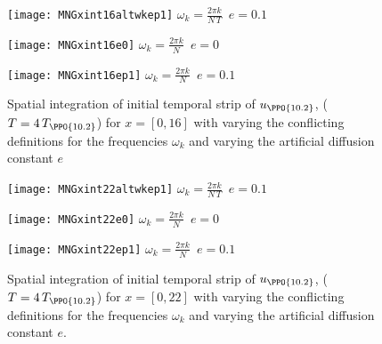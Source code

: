 \begin{description}
\begin{figure}[h]
  \begin{minipage}[height=.40\textheight]{.32\textwidth}
    \centering
    \texttt{[image: MNGxint16altwkep1]}
    \small{\texttt{$\omega_k = \frac{2 \pi k}{N\,T}$ $e=0.1$}}
  \end{minipage}
  \begin{minipage}[height=.40\textheight]{.32\textwidth}
    \centering
    \texttt{[image: MNGxint16e0]}
    \small{\texttt{$\omega_k = \frac{2 \pi k}{N}$ $e=0$}}
  \end{minipage}
  \begin{minipage}[height=.40\textheight]{.32\textwidth}
    \centering
    \texttt{[image: MNGxint16ep1]}
    \small{\texttt{$\omega_k = \frac{2 \pi k}{N}$ $e=0.1$}}
  \end{minipage}
  \caption{
  Spatial integration of initial temporal strip of $u_{\PPO{10.2}}$, ($T=4\,T_{\PPO{10.2}}$) for $x = [0,16]$
  with varying the conflicting definitions for the frequencies $\omega_k$ and varying the artificial diffusion constant $e$}
  \label{fig:MNGxint16}
\end{figure}

\begin{figure}[h]
  \begin{minipage}[height=.40\textheight]{.32\textwidth}
    \centering
    \texttt{[image: MNGxint22altwkep1]}
    \small{\texttt{$\omega_k = \frac{2 \pi k}{N\,T}$ $e=0.1$}}
  \end{minipage}
  \begin{minipage}[height=.40\textheight]{.32\textwidth}
    \centering
    \texttt{[image: MNGxint22e0]}
    \small{\texttt{$\omega_k = \frac{2 \pi k}{N}$ $e=0$}}
  \end{minipage}
  \begin{minipage}[height=.25\textheight]{.32\textwidth}
    \centering
    \texttt{[image: MNGxint22ep1]}
    \small{\texttt{$\omega_k = \frac{2 \pi k}{N}$ $e=0.1$}}
  \end{minipage}
   \caption{
  Spatial integration of initial temporal strip of $u_{\PPO{10.2}}$, ($T=4\,T_{\PPO{10.2}}$) for $x = [0,22]$
  with varying the conflicting definitions for the frequencies $\omega_k$ and varying the artificial diffusion constant $e$.
  }
  \label{fig:MNGxint22}
\end{figure}


\end{description}
